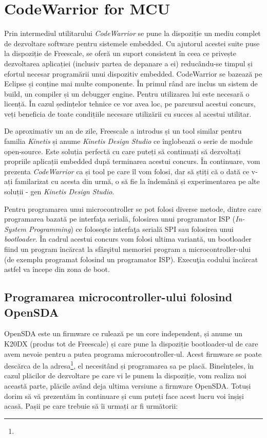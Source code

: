 \chapter{CodeWarrior for MCU}

Prin intermediul utilitarului \textit{CodeWarrior} se pune la dispoziție un mediu complet de dezvoltare software pentru sistemele embedded. Cu ajutorul acestei suite puse la dispoziție de Freescale, se oferă un suport consistent în ceea ce privește dezvoltarea aplicației (inclusiv partea de depanare a ei) reducându-se timpul și efortul necesar programării unui dispozitiv embedded. CodeWarrior se bazează pe Eclipse și conține mai multe componente. În primul rând are inclus un sistem de build, un compiler și un debugger engine. Pentru utilizarea lui este necesară o licență. În cazul ședințelor tehnice ce vor avea loc, pe parcursul acestui concurs, veți beneficia de toate condițiile necesare utilizării cu succes al acestui utilitar.

De aproximativ un an de zile, Freescale a introdus și un tool similar pentru familia \textit{Kinetis} și anume \textit{Kinetis Design Studio} ce înglobează o serie de module open-source. Este soluția perfectă cu care puteți să continuați să dezvoltați propriile aplicații embedded după terminarea acestui concurs. În continuare, vom prezenta \textit{CodeWarrior} ca și tool pe care îl vom folosi, dar să știți că o dată ce v-ați familarizat cu acesta din urmă, o să fie la îndemână și experimentarea pe alte soluții - gen \textit{Kinetis Design Studio}.

Pentru programarea unui microcontroller se pot folosi diverse metode, dintre care programarea bazată pe interfaţa serială, folosirea unui programator ISP (\textit{In-System Programming}) ce foloseşte interfaţa serială SPI sau folosirea unui \textit{bootloader}. În cadrul acestui concurs vom folosi ultima variantă, un bootloader fiind un program încărcat la sfârşitul memoriei program a microcontroller-ului (de exemplu programat folosind un programator ISP). Execuţia codului încărcat astfel va începe din zona de boot.

\section{Programarea microcontroller-ului folosind OpenSDA}

OpenSDA este un firmware ce rulează pe un core independent, și anume un K20DX (produs tot de Freescale) și care pune la dispoziție bootloader-ul de care avem nevoie pentru a putea programa microcontroller-ul. Acest firmware se poate descărca de la adresa\footnote{}, el necesitând și programarea sa pe placă. Bineînțeles, în cazul plăcilor de dezvoltare pe care vi le punem la dispoziție, vom realiza noi această parte, plăcile având deja ultima versiune a firmware OpenSDA. Totuși dorim să vă prezentăm în continuare și cum puteți face acest lucru voi înșiși acasă. Pașii pe care trebuie să îi urmați ar fi următorii:

